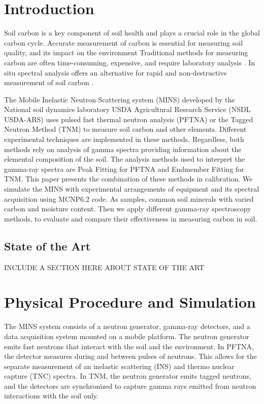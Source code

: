 \documentclass[preprint, 12pt, authoryear]{elsarticle}
\begin{document}
\section{Introduction}

Soil carbon is a key component of soil health and plays a crucial role in the global carbon cycle. Accurate measurement of carbon is essential for measuring soil quality, and its impact on the environment \cite{lal_soil_2018} Traditional methods for measuring carbon are often time-consuming, expensive, and require laboratory analysis \cite{de_ros_advancing_2025}. In situ spectral analysis offers an alternative for rapid and non-destructive measurement of soil carbon \cite{yakubova_tagged_2019}.

The Mobile Inelastic Neutron Scattering system (MINS) developed by the National soil dynamics laboratory USDA Agricultural Research Service (NSDL USDA-ARS) uses pulsed fast thermal neutron analysis (PFTNA) \cite{yakubova_measuring_2025} or the Tagged Neutron Method (TNM) \cite{yakubova_tagged_2019} to measure soil carbon and other elements. Different experimental techniques are implemented in these methods. Regardless, both methods rely on analysis of gamma spectra providing information about the elemental composition of the soil. The analysis methods used to interpret the gamma-ray spectra are Peak Fitting for PFTNA and Endmember Fitting for TNM. This paper presents the combination of these methods in calibration. We simulate the MINS with experimental arrangements of equipment and its spectral acquisition using MCNP6.2 code. As samples, common soil minerals with varied carbon and moisture content. Then we apply different gamma-ray spectroscopy methods, to evaluate and compare their effectiveness in measuring carbon in soil.

\subsection{State of the Art}

INCLUDE A SECTION HERE ABOUT STATE OF THE ART

\section{Physical Procedure and Simulation}

The MINS system consists of a neutron generator, gamma-ray detectors, and a data acquisition system mounted on a mobile platform. The neutron generator emits fast neutrons that interact with the soil and the environment. In PFTNA, the detector measures during and between pulses of neutrons. This allows for the separate measurement of an inelastic scattering (INS) and thermo nuclear capture (TNC) spectra. In TNM, the neutron generator emits tagged neutrons, and the detectors are synchronized to capture gamma rays emitted from neutron interactions with the soil only.
\end{document}
